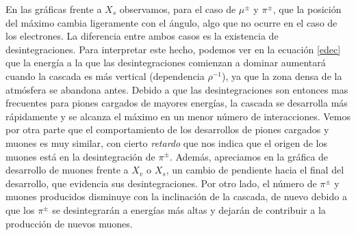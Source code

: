 \documentclass[11 pt, a4paper]{article} %
\numberwithin{equation}{section}
\numberwithin{figure}{section}
\numberwithin{table}{section}
\begin{document}
En las gráficas frente a $X_s$ observamos, para el caso de $\mu^\pm$ y $\pi^\pm$, que la posición del máximo cambia ligeramente con el ángulo, algo que no ocurre en el caso de los electrones. La diferencia entre ambos casos es la existencia de desintegraciones. Para interpretar este hecho, podemos ver en la ecuación \eqref{edec} que la energía a la que las desintegraciones comienzan a dominar aumentará cuando la cascada es más vertical (dependencia $\rho^{-1}$), ya que la zona densa de la atmósfera se abandona antes. Debido a que las desintegraciones son entonces mas frecuentes para piones cargados de mayores energías, la cascada se desarrolla más rápidamente y se alcanza el máximo en un menor número de interacciones. Vemos por otra parte que el comportamiento de los desarrollos de piones cargados y muones es muy similar, con cierto \textit{retardo} que nos indica que el origen de los muones está en la desintegración de $\pi^\pm$. Además, apreciamos en la gráfica de desarrollo de muones frente a $X_v$ o $X_s$, un cambio de pendiente hacia el final del desarrollo, que evidencia sus desintegraciones. Por otro lado, el número de $\pi^\pm$ y muones producidos disminuye con  la inclinación de la cascada, de nuevo debido a que los $\pi^\pm$ se desintegrarán a energías más altas y dejarán de contribuir a la producción de nuevos muones.
\end{document}
